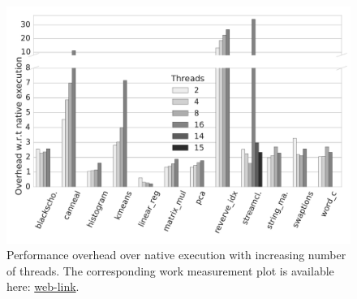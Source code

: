 
\begin{figure}[t]
\centering
\includegraphics[scale=0.25]{figure/benchmarks/times-Total_overheads.pdf}
\caption{Performance overhead  over native execution with increasing number of threads. The corresponding work measurement plot is available here: \href{https://mic92.github.io/inspector/index.html\#graph2}{web-link}.}
\label{fig:overheads}
\end{figure}
